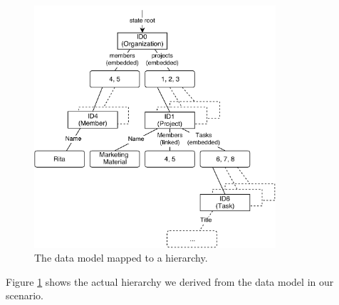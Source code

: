 \begin{figure}[hierarchy]
  \centering
  \includegraphics[width=0.8\textwidth]{img/hierarchy}
  \caption{The data model mapped to a hierarchy.}
  \label{fig:histo.hierarchy}
\end{figure}

Figure \ref{fig:histo.hierarchy} shows the actual hierarchy we derived from the data model in our scenario.
